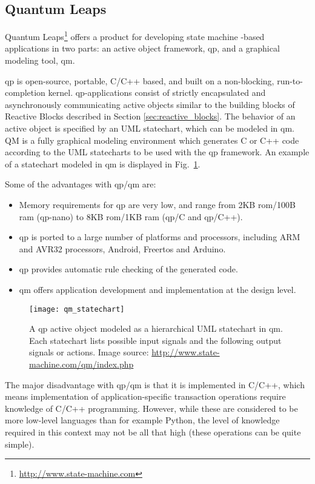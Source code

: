 \subsection{Quantum Leaps}
\label{sec:quantum_leaps}
Quantum Leaps\footnote{\url{http://www.state-machine.com}} offers a product for developing state machine -based applications in two parts: an active object framework, \gls{qp}, and a graphical modeling tool, \gls{qm}.

\noindent
\gls{qp} is open-source, portable, C/C++ based, and built on a non-blocking, run-to-completion kernel. \gls{qp}-applications consist of strictly encapsulated and asynchronously communicating active objects similar to the building blocks of Reactive Blocks described in Section \ref{sec:reactive_blocks}. The behavior of an active object is specified by an UML statechart, which can be modeled in \gls{qm}. QM is a fully graphical modeling environment which generates C or C++ code according to the UML statecharts to be used with the \gls{qp} framework. An example of a statechart modeled in \gls{qm} is displayed in Fig.~\ref{figure:qm_statechart}.

\noindent
Some of the advantages with \gls{qp}/\gls{qm} are:
\begin{itemize}
	\item Memory requirements for \gls{qp} are very low, and range from 2KB \gls{rom}/100B \gls{ram} (\gls{qp}-nano) to 8KB \gls{rom}/1KB \gls{ram} (\gls{qp}/C and \gls{qp}/C++).
	\item \gls{qp} is ported to a large number of platforms and processors, including ARM and AVR32 processors, Android, Free\gls{rtos} and Arduino.
	\item \gls{qp} provides automatic rule checking of the generated code.
	\item \gls{qm} offers application development and implementation at the design level.
\end{itemize}

\begin{figure}[htp]
	\centering
	\texttt{[image: qm\_statechart]}
	\caption[An UML statechart in QM]{A \gls{qp} active object modeled as a hierarchical UML statechart in \gls{qm}. Each statechart lists possible input signals and the following output signals or actions. Image source: \url{http://www.state-machine.com/qm/index.php}}
	\label{figure:qm_statechart}
\end{figure}

\noindent
The major disadvantage with \gls{qp}/\gls{qm} is that it is implemented in C/C++, which means implementation of application-specific transaction operations require knowledge of C/C++ programming. However, while these are considered to be more low-level languages than for example Python, the level of knowledge required in this context may not be all that high (these operations can be quite simple).

